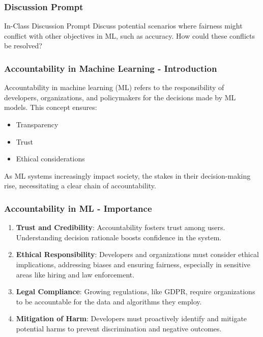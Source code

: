 \documentclass[aspectratio=169]{beamer}
\begin{document}
\begin{frame}[fragile]
    \frametitle{Discussion Prompt}
    \begin{block}{In-Class Discussion Prompt}
        Discuss potential scenarios where fairness might conflict with other objectives in ML, such as accuracy. How could these conflicts be resolved?
    \end{block}
\end{frame}

\begin{frame}[fragile]
    \frametitle{Accountability in Machine Learning - Introduction}
    Accountability in machine learning (ML) refers to the responsibility of developers, organizations, and policymakers for the decisions made by ML models. This concept ensures:
    \begin{itemize}
        \item Transparency
        \item Trust
        \item Ethical considerations
    \end{itemize}
    As ML systems increasingly impact society, the stakes in their decision-making rise, necessitating a clear chain of accountability.
\end{frame}

\begin{frame}[fragile]
    \frametitle{Accountability in ML - Importance}
    \begin{enumerate}
        \item \textbf{Trust and Credibility}:
            Accountability fosters trust among users. Understanding decision rationale boosts confidence in the system.
            
        \item \textbf{Ethical Responsibility}:
            Developers and organizations must consider ethical implications, addressing biases and ensuring fairness, especially in sensitive areas like hiring and law enforcement.
            
        \item \textbf{Legal Compliance}:
            Growing regulations, like GDPR, require organizations to be accountable for the data and algorithms they employ.
            
        \item \textbf{Mitigation of Harm}:
            Developers must proactively identify and mitigate potential harms to prevent discrimination and negative outcomes.
    \end{enumerate}
\end{frame}
\end{document}
